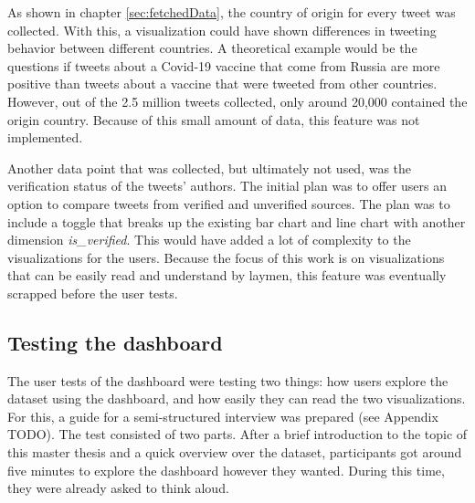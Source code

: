 As shown in chapter \ref{sec:fetchedData}, the country of origin for every tweet was collected. With this, a visualization could have shown differences in tweeting behavior between different countries. A theoretical example would be the questions if tweets about a Covid-19 vaccine that come from Russia are more positive than tweets about a vaccine that were tweeted from other countries. However, out of the 2.5 million tweets collected, only around 20,000 contained the origin country. Because of this small amount of data, this feature was not implemented.

Another data point that was collected, but ultimately not used, was the verification status of the tweets' authors. The initial plan was to offer users an option to compare tweets from verified and unverified sources. The plan was to include a toggle that breaks up the existing bar chart and line chart with another dimension \emph{is\_verified}. This would have added a lot of complexity to the visualizations for the users. Because the focus of this work is on visualizations that can be easily read and understand by laymen, this feature was eventually scrapped before the user tests.

\subsection{Testing the dashboard}
The user tests of the dashboard were testing two things: how users explore the dataset using the dashboard, and how easily they can read the two visualizations. For this, a guide for a semi-structured interview was prepared (see Appendix TODO). %
The test consisted of two parts. After a brief introduction to the topic of this master thesis and a quick overview over the dataset, participants got around five minutes to explore the dashboard however they wanted. During this time, they were already asked to think aloud.

